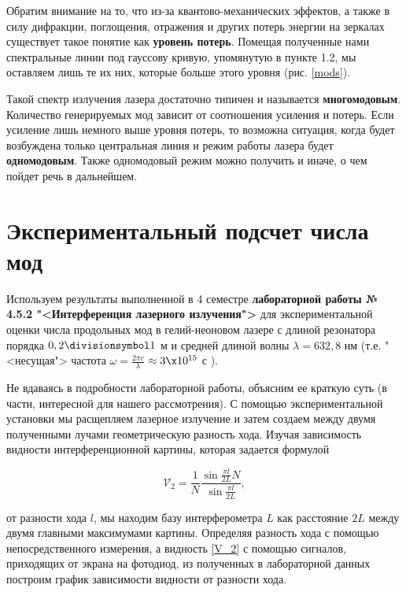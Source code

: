 \documentclass[12pt]{kiarticle}
\begin{document}
Обратим внимание на то, что из-за квантово-механических эффектов, а также в силу дифракции, поглощения, отражения и других потерь энергии на зеркалах существует такое понятие как \textbf{уровень потерь}. Помещая полученные нами спектральные линии под гауссову кривую, упомянутую в пункте 1.2, мы оставляем лишь те их них, которые больше этого уровня (рис. \ref{mods}).


Такой спектр излучения лазера достаточно типичен и называется \textbf{многомодовым}. Количество генерируемых мод
зависит от соотношения усиления и потерь. Если усиление лишь немного выше уровня потерь, то возможна ситуация, когда будет возбуждена
только центральная линия и режим работы лазера будет \textbf{одномодовым}. Также одномодовый режим можно получить и иначе, о чем пойдет речь в дальнейшем.

\section{Экспериментальный подсчет числа мод}

Используем результаты выполненной в 4 семестре \textbf{лабораторной работы № 4.5.2 "<Интерференция лазерного излучения">} для экспериментальной оценки числа продольных мод в гелий-неоновом лазере с длиной резонатора порядка $ 0,2 \divisionsymbol 1 $ м и средней длиной волны $ \lambda = 632,8 $ нм (т.е. "<несущая"> частота $ \omega = \frac{2\pi c}{\lambda} $
$\approx 3 \x 10^{15} $ с ). 

Не вдаваясь в подробности лабораторной работы, объясним ее краткую суть (в части, интересной для нашего рассмотрения). С помощью экспериментальной установки мы расщепляем лазерное излучение и затем создаем между двумя полученными лучами геометрическую разность хода. Изучая зависимость видности интерференционной картины, которая задается формулой

\begin{equation}\label{V_2}
\mathcal{V}_2 = \dfrac{1}{N} \dfrac{\sin {\frac{\pi l}{2L}N}}{\sin {\frac{\pi l}{2L}}},
\end{equation}

от разности хода $ l $, мы находим базу интерферометра $ L $ как расстояние $ 2L $ между двумя главными максимумами картины. Определяя разность хода с помощью непосредственного измерения, а видность \eqref{V_2} с помощью сигналов, приходящих от экрана на фотодиод, из полученных в лабораторной данных построим график зависимости видности от разности хода.
\end{document}
